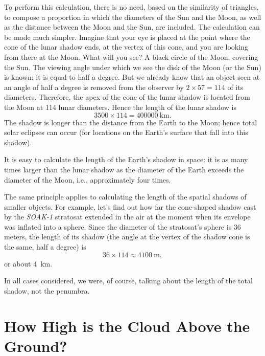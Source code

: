 To perform this calculation, there is no need, based on the similarity of triangles, to compose a proportion in which the diameters of the Sun and the Moon, as well as the distance between the Moon and the Sun, are included. The calculation can be made much simpler. Imagine that your eye is placed at the point where the cone of the lunar shadow ends, at the vertex of this cone, and you are looking from there at the Moon. What will you see? A black circle of the Moon, covering the Sun. The viewing angle under which we see the disk of the Moon (or the Sun) is known: it is equal to half a degree. But we already know that an object seen at an angle of half a degree is removed from the observer by $2 \times 57 = 114$ of its diameters. Therefore, the apex of the cone of the lunar shadow is located from the Moon at 114 lunar diameters. Hence the length of the lunar shadow is
\begin{equation*}%
3500 \times 114 = \SI{400000}{\kilo\meter}.
\end{equation*}
The shadow is longer than the distance from the Earth to the Moon; hence total solar eclipses can occur (for locations on the Earth's surface that fall into this shadow).

It is easy to calculate the length of the Earth's shadow in space: it is as many times larger than the lunar shadow as the diameter of the Earth exceeds the diameter of the Moon, i.e., approximately four times.

The same principle applies to calculating the length of the spatial shadows of smaller objects. For example, let's find out how far the cone-shaped shadow cast by the \emph{SOAK-1} stratosat extended in the air at the moment when its envelope was inflated into a sphere. Since the diameter of the stratosat's sphere is 36 meters, the length of its shadow (the angle at the vertex of the shadow cone is the same, half a degree) is
\begin{equation*}%
36 \times 114 \approx \SI{4100}{\meter},
\end{equation*}
or about \SI{4}{\kilo\meter}.

In all cases considered, we were, of course, talking about the length of the total shadow, not the penumbra.




\section{How High is the Cloud Above the Ground?}
\label{sec-3.15}

